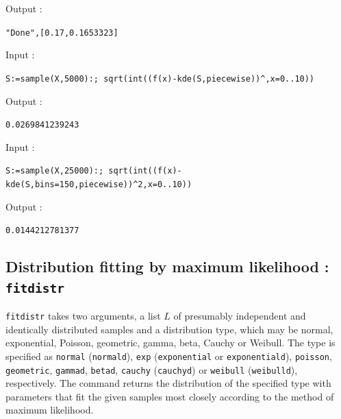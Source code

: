 \documentclass[a4paper,11pt]{book}
\begin{document}
Output :
\begin{center}
  \tt "Done",[0.17,0.1653323]
\end{center}
Input :
\begin{center}
  \tt S:=sample(X,5000):; sqrt(int((f(x)-kde(S,piecewise))\verb|^|,x=0..10))
\end{center}
Output :
\begin{center}
  \tt 0.0269841239243
\end{center}
Input :
\begin{center}
  \tt S:=sample(X,25000):; sqrt(int((f(x)-kde(S,bins=150,piecewise))\verb|^|2,x=0..10))
\end{center}
Output :
\begin{center}
  \tt 0.0144212781377
\end{center}

\subsection{Distribution fitting by maximum likelihood : {\tt fitdistr}}
{\tt fitdistr} takes two arguments, a list $L$ of presumably independent and identically distributed samples and a distribution type, which may be normal, exponential, Poisson, geometric, gamma, beta, Cauchy or Weibull. The type is specified as {\tt normal} ({\tt normald}), {\tt exp} ({\tt exponential} or {\tt exponentiald}), {\tt poisson}, {\tt geometric}, {\tt gammad}, {\tt betad}, {\tt cauchy} ({\tt cauchyd}) or {\tt weibull} ({\tt weibulld}), respectively. The command returns the distribution of the specified type with parameters that fit the given samples most closely according to the method of maximum likelihood.
\end{document}
